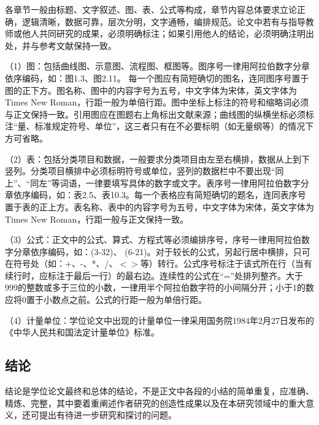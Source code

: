 各章节一般由标题、文字叙述、图、表、公式等构成，章节内容总体要求立论正确，逻辑清晰，数据可靠，层次分明，文字通畅，编排规范。论文中若有与指导教师或他人共同研究的成果，必须明确标注；如果引用他人的结论，必须明确注明出处，并与参考文献保持一致。
\par
（1）图：包括曲线图、示意图、流程图、框图等。图序号一律用阿拉伯数字分章依序编码，如：图1.3、图2.11。 每一个图应有简短确切的图名，连同图序号置于图的正下方。图名称、图中的内容字号为五号，中文字体为宋体，英文字体为Times New Roman，行距一般为单倍行距。图中坐标上标注的符号和缩略词必须与正文保持一致。引用图应在图题右上角标出文献来源；曲线图的纵横坐标必须标注“量、标准规定符号、单位”，这三者只有在不必要标明（如无量纲等）的情况下方可省略。
\par
（2）表：包括分类项目和数据，一般要求分类项目由左至右横排，数据从上到下竖列。分类项目横排中必须标明符号或单位，竖列的数据栏中不要出现“同上”、“同左”等词语，一律要填写具体的数字或文字。表序号一律用阿拉伯数字分章依序编码，如：表2.5、表10.3。每一个表格应有简短确切的题名，连同表序号置于表的正上方。表名称、表中的内容字号为五号，中文字体为宋体，英文字体为Times New Roman，行距一般与正文保持一致。
\par
（3）公式：正文中的公式、算式、方程式等必须编排序号，序号一律用阿拉伯数字分章依序编码，如：(3-32)、 (6-21)。对于较长的公式，另起行居中横排，只可在符号处（如：+、-、*、/、$<$$>$等）转行。公式序号标注于该式所在行（当有续行时，应标注于最后一行）的最右边。连续性的公式在“=”处排列整齐。大于999的整数或多于三位的小数，一律用半个阿拉伯数字符的小间隔分开；小于1的数应将0置于小数点之前。公式的行距一般为单倍行距。
\par
（4）计量单位：学位论文中出现的计量单位一律采用国务院1984年2月27日发布的《中华人民共和国法定计量单位》标准。
\subsection{结论}
结论是学位论文最终和总体的结论，不是正文中各段的小结的简单重复，应准确、精炼、完整，其中要着重阐述作者研究的创造性成果以及在本研究领域中的重大意义，还可提出有待进一步研究和探讨的问题。

